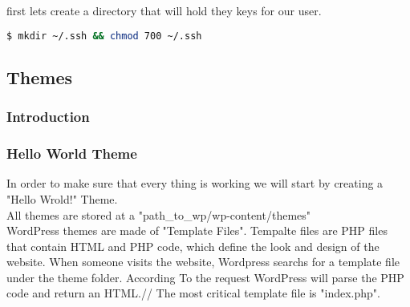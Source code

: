 \documentclass{book}
\begin{document}
first lets create a directory that will hold they keys for our user.
\begin{lstlisting}[language=bash]
$ mkdir ~/.ssh && chmod 700 ~/.ssh
\end{lstlisting}

\chapter{Themes}
\section{Introduction}
\section{Hello World Theme}
In order to make sure that every thing is working we will start by creating a "Hello Wrold!" Theme.\\
All themes are stored at a "path\_to\_wp/wp-content/themes"\\
WordPress themes are made of "Template Files". Tempalte files are PHP files that contain HTML and PHP code, which 
define the look and design of the website. When someone visits the website, Wordpress searchs for a template file
under the theme folder. According To the request WordPress will parse the PHP code and return an HTML.//
The most critical template file is "index.php".



\part{}
\end{document}
